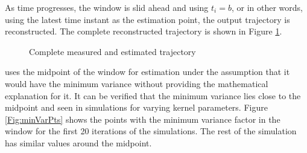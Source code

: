 \documentclass[letterpaper%
, twoside%
, 12pt%
,memoire%
, english%
,creativecommons,hyperref%
]{thETS}
\theoremstyle{newThmStyle}
\begin{document}
As time progresses, the window is slid ahead and using $t_i=b$, or in other words, using the latest time instant as the estimation point, the output trajectory is reconstructed. The complete reconstructed trajectory is shown in Figure \ref{Fig:recon}.\\
\begin{figure}[H]
	\centering
	\parbox{0.75\textwidth}{\caption{Complete measured and estimated trajectory\label{Fig:recon}}}
\end{figure}

\citep{RN120} uses the midpoint of the window for estimation under the assumption that it would have the minimum variance without providing the mathematical explanation for it. It can be verified that the minimum variance lies close to the midpoint and seen in simulations for varying kernel parameters. Figure \ref{Fig:minVarPts} shows the points with the minimum variance factor in the window for the first 20 iterations of the simulations. The rest of the simulation has similar values around the midpoint. 
\end{document}

